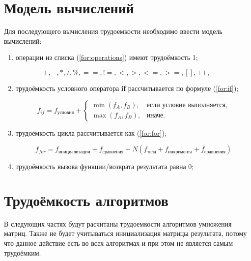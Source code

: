 \clearpage

\section{Модель вычислений}

Для последующего вычисления трудоемкости необходимо ввести модель вычислений:

\begin{enumerate}
	
	\item операции из списка (\ref{for:operations}) имеют трудоёмкость 1;
	
	\begin{equation}
		\label{for:operations}
		+, -, *, /, \%, ==, !=, <, >, <=, >=, [], ++, {-}-
	\end{equation}
	
	\item трудоёмкость условного оператора \textbf{if} рассчитывается по формуле (\ref{for:if});
	
	\begin{equation}
		\label{for:if}
		f_{if} = f_{\text{условия}} +
		\begin{cases}
			\min(f_A, f_B), & \text{если условие выполняется}, \\
			\max(f_A, f_B), & \text{иначе}.
		\end{cases}
	\end{equation}
	
	\item трудоёмкость цикла рассчитывается как (\ref{for:for});
	
	\begin{equation}
		\label{for:for}
		f_{for} = f_{\text{инициализации}} + f_{\text{сравнения}} + N(f_{\text{тела}} + f_{\text{инкремента}} + f_{\text{сравнения}})
	\end{equation}
	
	\item трудоёмкость вызова функции/возврата результата равна 0;
	
\end{enumerate}

\section{Трудоёмкость алгоритмов}

В следующих частях будут расчитаны трудоемкости алгоритмов умножения матриц.
Также не будет учитываться инициализация матрицы результата, потому что данное действие есть во всех алгоритмах и при этом не является самым трудоёмким.

